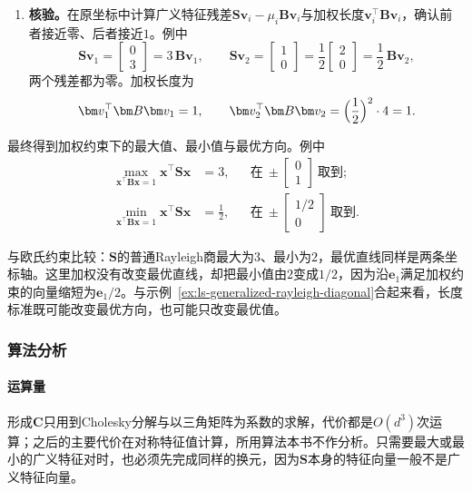 \begin{enumerate}
 \item \textbf{核验。}在原坐标中计算广义特征残差$\bm S\bm v_i-\mu_i\bm B\bm v_i$与加权长度$\bm v_i^\top\bm B\bm v_i$，确认前者接近零、后者接近$1$。例中
 \[
  \bm S\bm v_1=\begin{bmatrix}0\\3\end{bmatrix}=3\,\bm B\bm v_1,\qquad
  \bm S\bm v_2=\begin{bmatrix}1\\0\end{bmatrix}=\frac12\begin{bmatrix}2\\0\end{bmatrix}=\frac12\,\bm B\bm v_2 ,
 \]
 两个残差都为零。加权长度为
 \[
  \bm v_1^\top\bm B\bm v_1=1,\qquad \bm v_2^\top\bm B\bm v_2=\Bigl(\frac12\Bigr)^2\cdot4=1 .
 \]
\end{enumerate}

最终得到加权约束下的最大值、最小值与最优方向。例中
\[
 \begin{aligned}
 \max_{\bm x^\top\bm B\bm x=1}\bm x^\top\bm S\bm x&=3, &&\text{在}\ \pm\begin{bmatrix}0\\1\end{bmatrix}\ \text{取到};\\
 \min_{\bm x^\top\bm B\bm x=1}\bm x^\top\bm S\bm x&=\frac12, &&\text{在}\ \pm\begin{bmatrix}1/2\\0\end{bmatrix}\ \text{取到}.
 \end{aligned}
\]

与欧氏约束比较：$\bm S$的普通Rayleigh商最大为$3$、最小为$2$，最优直线同样是两条坐标轴。这里加权没有改变最优直线，却把最小值由$2$变成$1/2$，因为沿$\bm e_1$满足加权约束的向量缩短为$\bm e_1/2$。与示例~\ref{ex:ls-generalized-rayleigh-diagonal}合起来看，长度标准既可能改变最优方向，也可能只改变最优值。

\subsubsection{算法分析}

\paragraph{运算量}
形成$\bm C$只用到Cholesky分解与以三角矩阵为系数的求解，代价都是$O(d^3)$次运算；之后的主要代价在对称特征值计算，所用算法本书不作分析。只需要最大或最小的广义特征对时，也必须先完成同样的换元，因为$\bm S$本身的特征向量一般不是广义特征向量。

